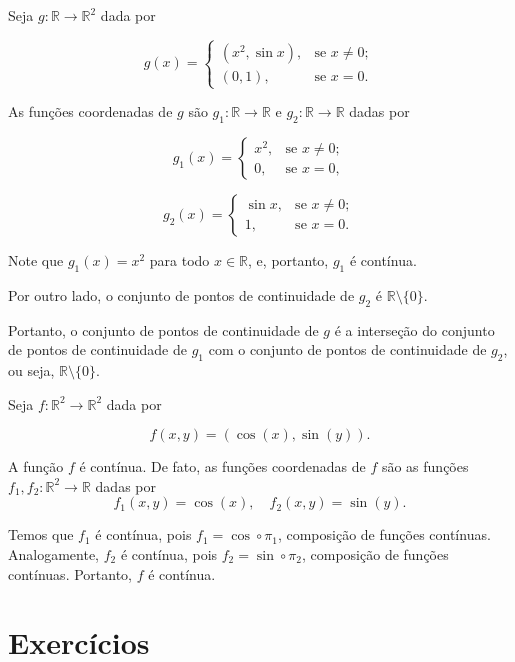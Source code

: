 \begin{example}
    Seja $g:\mathbb R\to \mathbb R^2$ dada por

    \[
        g(x) = \begin{cases}
            (x^2, \sin x), & \text{se } x\neq 0;\\
            (0, 1), & \text{se } x=0.
        \end{cases}
    \]

    As funções coordenadas de $g$ são $g_1:\mathbb R\to \mathbb R$ e $g_2:\mathbb R\to \mathbb R$ dadas por

    \[
        g_1(x) = \begin{cases}
            x^2, & \text{se } x\neq 0;\\
            0, & \text{se } x=0,
        \end{cases}
    \]

    \[
        g_2(x) = \begin{cases}
            \sin x, & \text{se } x\neq 0;\\
            1, & \text{se } x=0.
        \end{cases}
    \]

    Note que $g_1(x)=x^2$ para todo $x\in \mathbb R$, e, portanto, $g_1$ é contínua.

    Por outro lado, o conjunto de pontos de continuidade de $g_2$ é $\mathbb R\setminus\{0\}$.

    Portanto, o conjunto de pontos de continuidade de $g$ é a interseção do conjunto de pontos de continuidade de $g_1$ com o conjunto de pontos de continuidade de $g_2$, ou seja, $\mathbb R\setminus\{0\}$.
\end{example}

\begin{example}
    Seja $f:\mathbb R^2\rightarrow \mathbb R^2$ dada por

    \[
        f(x, y)=(\cos(x), \sin(y)).
    \]
    
    A função $f$ é contínua.
    De fato, as funções coordenadas de $f$ são as funções $f_1,f_2:\mathbb R^2\to \mathbb R$ dadas por
    \[
        f_1(x, y)=\cos(x), \quad f_2(x, y)=\sin(y).
    \]

    Temos que $f_1$ é contínua, pois $f_1=\cos\circ \pi_1$, composição de funções contínuas.
    Analogamente, $f_2$ é contínua, pois $f_2=\sin\circ \pi_2$, composição de funções contínuas.
    Portanto, $f$ é contínua.
\end{example}

\section*{Exercícios}

